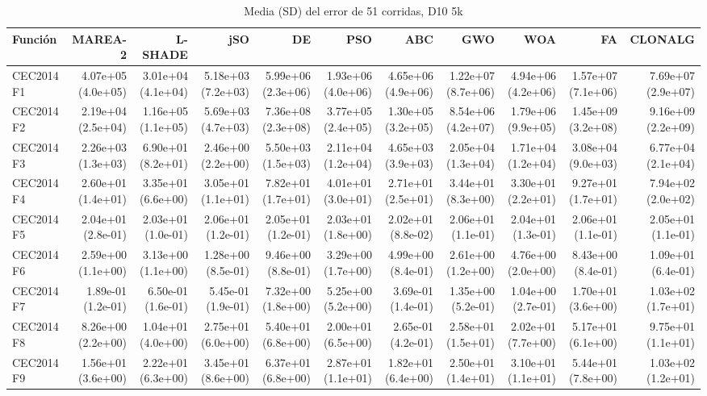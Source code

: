 \begin{longtable}{lrrrrrrrrrr}
\caption{Media (SD) del error de 51 corridas, D10 5k}\\
\toprule
Función & MAREA-2 & L-SHADE & jSO & DE & PSO & ABC & GWO & WOA & FA & CLONALG \\
\midrule
\endhead
CEC2014 F1 & 4.07e+05 (4.0e+05) & 3.01e+04 (4.1e+04) & 5.18e+03 (7.2e+03) & 5.99e+06 (2.3e+06) & 1.93e+06 (4.0e+06) & 4.65e+06 (4.9e+06) & 1.22e+07 (8.7e+06) & 4.94e+06 (4.2e+06) & 1.57e+07 (7.1e+06) & 7.69e+07 (2.9e+07) \\
CEC2014 F2 & 2.19e+04 (2.5e+04) & 1.16e+05 (1.1e+05) & 5.69e+03 (4.7e+03) & 7.36e+08 (2.3e+08) & 3.77e+05 (2.4e+05) & 1.30e+05 (3.2e+05) & 8.54e+06 (4.2e+07) & 1.79e+06 (9.9e+05) & 1.45e+09 (3.2e+08) & 9.16e+09 (2.2e+09) \\
CEC2014 F3 & 2.26e+03 (1.3e+03) & 6.90e+01 (8.2e+01) & 2.46e+00 (2.2e+00) & 5.50e+03 (1.5e+03) & 2.11e+04 (1.2e+04) & 4.65e+03 (3.9e+03) & 2.05e+04 (1.3e+04) & 1.71e+04 (1.2e+04) & 3.08e+04 (9.0e+03) & 6.77e+04 (2.1e+04) \\
CEC2014 F4 & 2.60e+01 (1.4e+01) & 3.35e+01 (6.6e+00) & 3.05e+01 (1.1e+01) & 7.82e+01 (1.7e+01) & 4.01e+01 (3.0e+01) & 2.71e+01 (2.5e+01) & 3.44e+01 (8.3e+00) & 3.30e+01 (2.2e+01) & 9.27e+01 (1.7e+01) & 7.94e+02 (2.0e+02) \\
CEC2014 F5 & 2.04e+01 (2.8e-01) & 2.03e+01 (1.0e-01) & 2.06e+01 (1.2e-01) & 2.05e+01 (1.2e-01) & 2.03e+01 (1.8e+00) & 2.02e+01 (8.8e-02) & 2.06e+01 (1.1e-01) & 2.04e+01 (1.3e-01) & 2.06e+01 (1.1e-01) & 2.05e+01 (1.1e-01) \\
CEC2014 F6 & 2.59e+00 (1.1e+00) & 3.13e+00 (1.1e+00) & 1.28e+00 (8.5e-01) & 9.46e+00 (8.8e-01) & 3.29e+00 (1.7e+00) & 4.99e+00 (8.4e-01) & 2.61e+00 (1.2e+00) & 4.76e+00 (2.0e+00) & 8.43e+00 (8.4e-01) & 1.09e+01 (6.4e-01) \\
CEC2014 F7 & 1.89e-01 (1.2e-01) & 6.50e-01 (1.6e-01) & 5.45e-01 (1.9e-01) & 7.32e+00 (1.8e+00) & 5.25e+00 (5.2e+00) & 3.69e-01 (1.4e-01) & 1.35e+00 (5.2e-01) & 1.04e+00 (2.7e-01) & 1.70e+01 (3.6e+00) & 1.03e+02 (1.7e+01) \\
CEC2014 F8 & 8.26e+00 (2.2e+00) & 1.04e+01 (4.0e+00) & 2.75e+01 (6.0e+00) & 5.40e+01 (6.8e+00) & 2.00e+01 (6.5e+00) & 2.65e-01 (4.2e-01) & 2.58e+01 (1.5e+01) & 2.02e+01 (7.7e+00) & 5.17e+01 (6.1e+00) & 9.75e+01 (1.1e+01) \\
CEC2014 F9 & 1.56e+01 (3.6e+00) & 2.22e+01 (6.3e+00) & 3.45e+01 (8.6e+00) & 6.37e+01 (6.8e+00) & 2.87e+01 (1.1e+01) & 1.82e+01 (6.4e+00) & 2.50e+01 (1.4e+01) & 3.10e+01 (1.1e+01) & 5.44e+01 (7.8e+00) & 1.03e+02 (1.2e+01) \\

\end{longtable}
